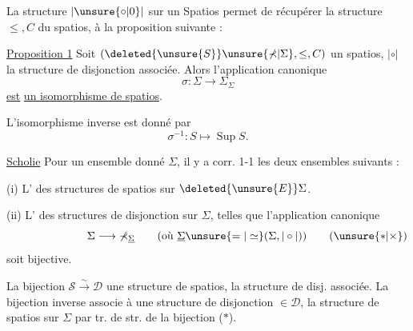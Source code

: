 La structure $\mathrel{|\unsure{\circ|0}|}$ sur un Spatios permet de récupérer la structure $\leq,C$ du spatios,  à la proposition suivante :


\uline{Proposition 1} Soit $(\deleted{\unsure{S}}\unsure{\mathbb{\Sigma}|\Sigma},\leq,C)$ un spatios, $\mathrel{|\circ|}$ la structure de disjonction associée. Alors l'application canonique
\[
\sigma:\Sigma\longrightarrow \mathbb{\Sigma}_{\Sigma}
\]
\uline{est}  \uline{un isomorphisme de spatios}.

L'isomorphisme inverse est donné par
\[
\sigma^{-1}:S\longmapsto\operatorname{Sup}S.
\]


\uline{Scholie} Pour un ensemble donné $\Sigma$, il y a corr. 1-1  les deux ensembles suivants :

(i) L'  des structures de spatios  sur $\deleted{\unsure{E}}\Sigma$.

(ii) L'  des structures de disjonction \inserted{$\mathrel{|\circ|}$} sur $\Sigma$, telles que l'application canonique
\[
\Sigma\longrightarrow\mathbb{\Sigma}_{\underline{\Sigma}}\qquad
(\text{où }\underline{\Sigma}\unsure{=|\simeq}(\Sigma,\mathrel{|\circ|}))
\tag*{\makebox[0pt][r]{\makebox[\displaywidth][l]{($\unsure{\ast|\times}$)}}}
\]
soit bijective.

 La bijection $\mathscr{S}\overset{\sim}{\longrightarrow}\mathscr{D}$    une structure de spatios, la structure de disj. associée. La bijection inverse associe à une structure de disjonction $\in\mathscr{D}$, la structure de spatios sur $\Sigma$  par tr. de str. de la bijection ($\ast$).

